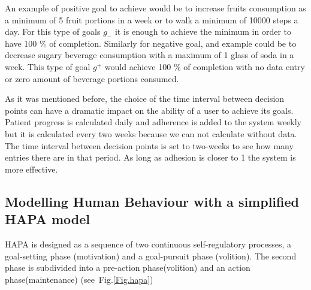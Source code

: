 \documentclass[graybox]{svmult}
\begin{document}
An example of positive goal to achieve would be to increase fruits consumption as a minimum of 5 fruit portions in a week or to walk a minimum of 10000 steps a day. For this type of goals  $g_{-}$ it is enough to achieve the minimum in order to have 100 \% of completion. Similarly for negative goal, and example could be to decrease sugary beverage consumption with a maximum of 1 glass of soda in a week.  This type of goal $g^{+}$ would achieve 100  \% of completion with no data entry or zero amount of beverage portions consumed.

As it was mentioned before, the choice of the time interval between decision points can have a dramatic impact on the ability of a user to achieve its goals. Patient progress is calculated daily and adherence is added to the system weekly but it is calculated every two weeks because we can not calculate without data. The time interval between decision points is set to two-weeks to see how many entries there are in that period. As long as adhesion is closer to 1 the system is more effective.

\subsection{Modelling Human Behaviour with a simplified HAPA model}

HAPA is designed as a sequence of two continuous self-regulatory processes, a goal-setting phase (motivation) and a goal-pursuit phase (volition). The second phase is subdivided into a pre-action phase(volition) and an action phase(maintenance) (see~Fig.\ref{Fig.hapa})
\end{document}
